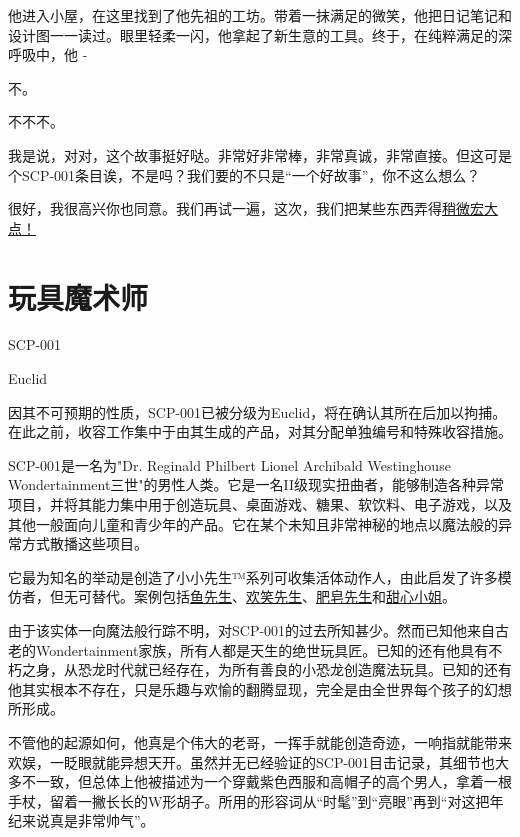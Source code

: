他进入小屋，在这里找到了他先祖的工坊。带着一抹满足的微笑，他把日记笔记和设计图一一读过。眼里轻柔一闪，他拿起了新生意的工具。终于，在纯粹满足的深呼吸中，他 -

不。

不不不。

我是说，对对，这个故事挺好哒。非常好非常棒，非常真诚，非常直接。但这可是个SCP-001条目诶，不是吗？我们要的不只是“一个好故事”，你不这么想么？

很好，我很高兴你也同意。我们再试一遍，这次，我们把某些东西弄得\hyperref[sec:SCP-001.a.simple.toymaker.offset.1]{稍微宏大点！}

\newpage

\section{玩具魔术师}

\label{sec:SCP-001.a.simple.toymaker.offset.1}

SCP-001

Euclid

因其不可预期的性质，SCP-001已被分级为Euclid，将在确认其所在后加以拘捕。在此之前，收容工作集中于由其生成的产品，对其分配单独编号和特殊收容措施。

SCP-001是一名为"Dr. Reginald Philbert Lionel Archibald Westinghouse Wondertainment三世"的男性人类。它是一名II级现实扭曲者，能够制造各种异常项目，并将其能力集中用于创造玩具、桌面游戏、糖果、软饮料、电子游戏，以及其他一般面向儿童和青少年的产品。它在某个未知且非常神秘的地点以魔法般的异常方式散播这些项目。

它最为知名的举动是创造了小小先生™系列可收集活体动作人，由此启发了许多模仿者，但无可替代。案例包括\hyperref[chap:SCP-527]{鱼先生}、\hyperref[chap:SCP-1799]{欢笑先生}、\hyperref[chap:SCP-1908]{肥皂先生}和\hyperref[chap:SCP-2396]{甜心小姐}。

由于该实体一向魔法般行踪不明，对SCP-001的过去所知甚少。然而已知他来自古老的Wondertainment家族，所有人都是天生的绝世玩具匠。已知的还有他具有不朽之身，从恐龙时代就已经存在，为所有善良的小恐龙创造魔法玩具。已知的还有他其实根本不存在，只是乐趣与欢愉的翻腾显现，完全是由全世界每个孩子的幻想所形成。

不管他的起源如何，他真是个伟大的老哥，一挥手就能创造奇迹，一响指就能带来欢娱，一眨眼就能异想天开。虽然并无已经验证的SCP-001目击记录，其细节也大多不一致，但总体上他被描述为一个穿戴紫色西服和高帽子的高个男人，拿着一根手杖，留着一撇长长的W形胡子。所用的形容词从“时髦”到“亮眼”再到“对这把年纪来说真是非常帅气”。

